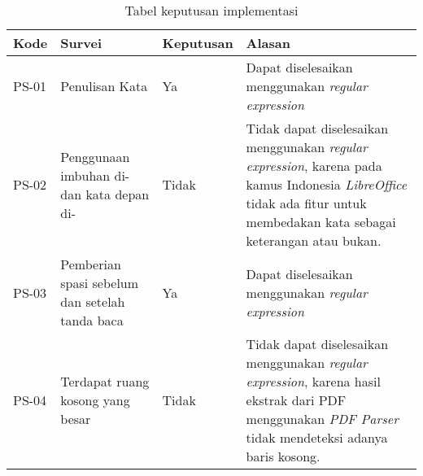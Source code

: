 \begin{table}[H]
	\caption {Tabel keputusan implementasi} \label{tab:keputusan}
	\begin{center}
		\begin{tabular}{|p{1.5 cm}|>{\raggedright} p{4 cm}| p{2 cm}| p{7 cm}|}
		\hline
		Kode & Survei & Keputusan & Alasan \\ 
		\hline 
		PS-01 & Penulisan Kata & Ya & Dapat diselesaikan menggunakan \textit{regular expression} \newline \\ 
		\hline 
		PS-02 & Penggunaan imbuhan di- dan kata depan di- & Tidak & Tidak dapat diselesaikan menggunakan \textit{regular expression}, karena pada kamus Indonesia \textit{LibreOffice} tidak ada fitur untuk membedakan kata sebagai keterangan atau bukan. \newline \\ 
		\hline 
		PS-03 & Pemberian spasi sebelum dan setelah tanda baca & Ya & Dapat diselesaikan menggunakan \textit{regular expression} \newline \\ 
		\hline 
		PS-04 & Terdapat ruang kosong yang besar & Tidak & Tidak dapat diselesaikan menggunakan \textit{regular expression}, karena hasil ekstrak dari PDF menggunakan \textit{PDF Parser} tidak mendeteksi adanya baris kosong. \newline \\ 
		\hline 
		\end{tabular}
	\end{center}
\end{table}


